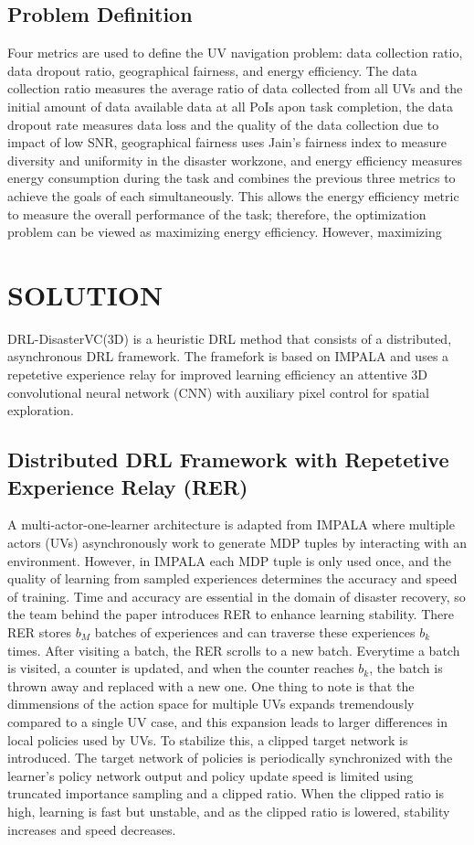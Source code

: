 \documentclass[sigconf, natbib=false]{acmart}
\begin{document}
   \subsection{Problem Definition}
   Four metrics are used to define the UV navigation problem: data collection ratio, data dropout ratio, geographical fairness, and energy efficiency. The data collection ratio measures the average ratio of data collected from all UVs and the initial amount of data available data at all PoIs apon task completion, the data dropout rate measures data loss and the quality of the data collection due to impact of low SNR, geographical fairness uses Jain's fairness index to measure diversity and uniformity in the disaster workzone, and energy efficiency measures energy consumption during the task and combines the previous three metrics to achieve the goals of each simultaneously. This allows the energy efficiency metric to measure the overall performance of the task; therefore, the optimization problem can be viewed as maximizing energy efficiency. However, maximizing 

   \section{SOLUTION}
   DRL-DisasterVC(3D) is a heuristic DRL method that consists of a distributed, asynchronous DRL framework. The framefork is based on IMPALA and uses a repetetive experience relay for improved learning efficiency an attentive 3D convolutional neural network (CNN) with auxiliary pixel control for spatial exploration.

   \subsection{Distributed DRL Framework with Repetetive Experience Relay (RER)}
   A multi-actor-one-learner architecture is adapted from IMPALA where multiple actors (UVs) asynchronously work to generate MDP tuples by interacting with an environment. However, in IMPALA each MDP tuple is only used once, and the quality of learning from sampled experiences determines the accuracy and speed of training. Time and accuracy are essential in the domain of disaster recovery, so the team behind the paper introduces RER to enhance learning stability. There RER stores $b_M$ batches of experiences and can traverse these experiences $b_k$ times. After visiting a batch, the RER scrolls to a new batch. Everytime a batch is visited, a counter is updated, and when the counter reaches $b_k$, the batch is thrown away and replaced with a new one. One thing to note is that the dimmensions of the action space for multiple UVs expands tremendously compared to a single UV case, and this expansion leads to larger differences in local policies used by UVs. To stabilize this, a clipped target network is introduced. The target network of policies is periodically synchronized with the learner's policy network output and policy update speed is limited using truncated importance sampling and a clipped ratio. When the clipped ratio is high, learning is fast but unstable, and as the clipped ratio is lowered, stability increases and speed decreases. 
   
\end{document}
